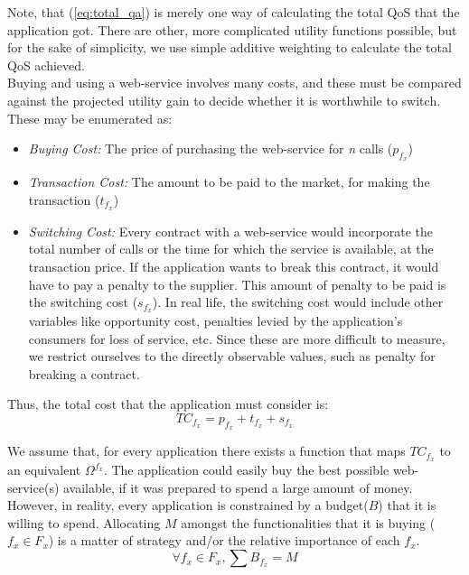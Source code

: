\documentclass[10pt,journal,compsoc]{IEEEtran}
\begin{document}
Note, that (\ref{eq:total_qa}) is merely one way of calculating the total QoS that the application got. There are other, more complicated utility functions possible, but for the sake of simplicity, we use simple additive weighting\cite{Yoon1995Multiple} to calculate the total QoS achieved.\\
Buying and using a web-service involves many costs, and these must be compared against the projected utility gain to decide whether it is worthwhile to switch. These may be enumerated as:
	\begin{itemize}
	 \item \textit{Buying Cost:} The price of purchasing the web-service for \textsl{n} calls ($p_{f_x}$)
	 \item \textit{Transaction Cost:} The amount to be paid to the market, for making the transaction ($t_{f_x}$)
	 \item \textit{Switching Cost:} Every contract with a web-service would incorporate the total number of calls or the time for which the service is available, at the transaction price. If the application wants to break this contract, it would have to pay a penalty to the supplier. This amount of penalty to be paid is the switching cost ($s_{f_x}$). In real life, the switching cost would include other variables like opportunity cost, penalties levied by the application's consumers for loss of service, etc. Since these are more difficult to measure, we restrict ourselves to the directly observable values, such as penalty for breaking a contract.
	 \end{itemize}
Thus, the total cost that the application must consider is:
	\begin{equation}\label{eq:total_cost} 
	 TC_{f_x} = p_{f_x} + t_{f_x} + s_{f_x}
	\end{equation}
	 
We assume that, for every application there exists a function that maps $TC_{f_x}$ to an equivalent $\Omega^{f_x}$. The application could easily buy the best possible web-service(s) available, if it was prepared to spend a large amount of money. However, in reality, every application is constrained by a budget($B$) that it is willing to spend. Allocating $M$ amongst the functionalities that it is buying ($f_x \in F_x$) is a matter of strategy and/or the relative importance of each $f_x$. 
	\begin{equation}
	 \forall f_{x} \in F_{x}, \sum B_{f_x} = M 
	\end{equation}
\end{document}
